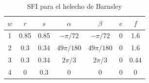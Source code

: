 \begin{table}
    \centering
    \begin{tabular}{c|cccccc} \hline
        $w$ & $r$ & $s$ & $\alpha$ & $\beta$ & $e$ & $f$ \\ \hline\hline
    1 & 0.85 & 0.85 & $-\pi/72$ & $-\pi/72$ & 0 & 1.6 \\ \hline
    2 & 0.3 & 0.34 & $49 \pi/180$ & $49 \pi/180$ & 0 & 1.6 \\ \hline
    3 & 0.3 & 0.34 & $2 \pi/3$ & $2 \pi/3$ & 0 & 0.44 \\ \hline
    4 & 0 & 0.3 & 0 & 0 & 0 & 0 \\ \hline
    \end{tabular}
    \caption{SFI para el helecho de Barnsley}
    \label{tabla:helecho-Barnsley}
\end{table}

